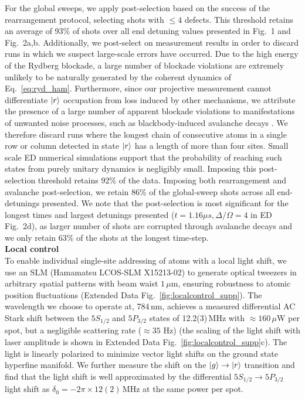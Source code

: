 \documentclass[reprint,twocolumn,secnumarabic,amssymb, aps, prx]{revtex4-2}
\begin{document}
For the global sweeps, we apply post-selection based on the success of the rearrangement protocol, selecting shots with $\leq 4$ defects. This threshold retains an average of 93\% of shots over all end detuning values presented in Fig.~1 and Fig.~2a,b. Additionally, we post-select on measurement results in order to discard runs in which we suspect large-scale errors have occurred. Due to the high energy of the Rydberg blockade, a large number of blockade violations are extremely unlikely to be naturally generated by the coherent dynamics of Eq.~\eqref{eq:ryd_ham}. Furthermore, since our projective measurement cannot differentiate $\ket{r}$ occupation from loss induced by other mechanisms,  we attribute the presence of a large number of apparent blockade violations to manifestations of unwanted noise processes, such as blackbody-induced avalanche decays \cite{festa2022blackbody}. We therefore discard runs where the longest chain of consecutive atoms in a single row or column detected in state $\ket{r}$ has a length of more than four sites. Small scale ED numerical simulations support that the probability of reaching such states from purely unitary dynamics is negligibly small. Imposing this post-selection threshold retains $92\%$ of the data. Imposing both rearrangement and avalanche post-selection, we retain 86\% of the global-sweep shots across all end-detunings presented.
We note that the post-selection is most significant for  the longest times and largest detunings presented ($t = 1.16 \mu s, \Delta/\Omega = 4$ in ED Fig.~2d), as larger  number of shots are corrupted through avalanche decays and we only retain $63\%$ of the shots at the longest time-step.
\\

\noindent\textbf{Local control}\\
To enable individual single-site addressing of atoms with a local light shift, we use an SLM (Hamamatsu LCOS-SLM X15213-02) to generate optical tweezers in arbitrary spatial patterns with beam waist $1\,\mu$m, ensuring robustness to atomic position fluctuations (Extended Data Fig.~\ref{fig:localcontrol_supp}). The wavelength we choose to operate at, 784\,nm, achieves a measured differential AC Stark shift between the $5S_{1/2}$ and $5P_{3/2}$ states of 12.2(3)\,MHz with $\approx160\,{\mu}$W per spot, but a negligible scattering rate ($\approx 35$ Hz) (the scaling of the light shift with laser amplitude is shown in Extended Data Fig.~\ref{fig:localcontrol_supp}c). The light is linearly polarized to minimize vector light shifts on the ground state hyperfine manifold. We further measure the shift on the $\ket{g}\rightarrow\ket{r}$ transition and find that the light shift is well approximated by the differential $5S_{1/2}\rightarrow5P_{3/2}$ light shift as $\delta_0 = -2\pi\times12(2)$\,MHz at the same power per spot. 
\end{document}
